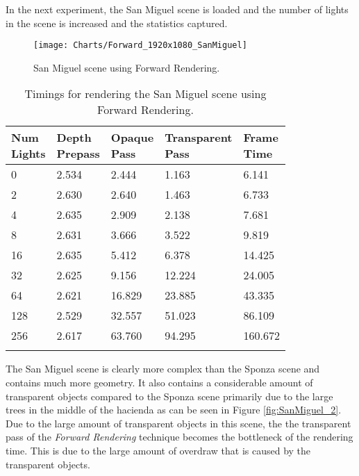 In the next experiment, the San Miguel scene is loaded and the number of lights in the scene is increased and the statistics captured.

\begin{figure}[H]
\centering
\texttt{[image: Charts/Forward\_1920x1080\_SanMiguel]}
\decoRule
\caption{San Miguel scene using Forward Rendering.}
\label{fig:Forward_1920x1080_SanMiguel}
\end{figure}

\begin{table}[H]
\caption{Timings for rendering the San Miguel scene using Forward Rendering.}
\label{tab:Forward_1920x1080_SanMiguel}
\centering
\begin{tabular}{*{5}{l}}
\toprule
\thead{Num \\Lights} & \thead{Depth \\Prepass} & \thead{Opaque \\Pass} & \thead{Transparent \\Pass} & \thead{Frame \\Time } \\
\midrule
0 & 2.534 & 2.444 & 1.163 & 6.141 \\
2 & 2.630 & 2.640 & 1.463 & 6.733 \\
4 & 2.635 & 2.909 & 2.138 & 7.681 \\
8 & 2.631 & 3.666 & 3.522 & 9.819 \\
16 & 2.635 & 5.412 & 6.378 & 14.425 \\
32 & 2.625 & 9.156 & 12.224 & 24.005 \\
64 & 2.621 & 16.829 & 23.885 & 43.335 \\
128 & 2.529 & 32.557 & 51.023 & 86.109 \\
256 & 2.617 & 63.760 & 94.295 & 160.672 \\
\bottomrule\\
\end{tabular}
\end{table}

The San Miguel scene is clearly more complex than the Sponza scene and contains much more geometry. It also contains a considerable amount of transparent objects compared to the Sponza scene primarily due to the large trees in the middle of the hacienda as can be seen in Figure \ref{fig:SanMiguel_2}. Due to the large amount of transparent objects in this scene, the the transparent pass of the \emph{Forward Rendering} technique becomes the bottleneck of the rendering time. This is due to the large amount of overdraw that is caused by the transparent objects.

